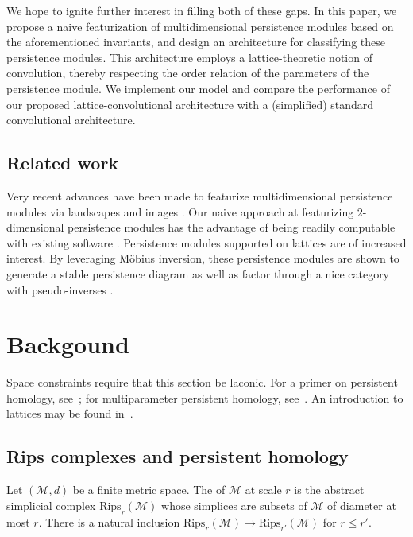 \documentclass{article}
\begin{document}
We hope to ignite further interest in filling both of these gaps. In this paper, we
propose a naive featurization of multidimensional persistence modules based on
the aforementioned invariants, and design an architecture for classifying these
persistence modules. This architecture employs a lattice-theoretic notion of
convolution, thereby respecting the order relation of the parameters of the
persistence module. We implement our model and compare the performance of our
proposed lattice-convolutional architecture with a (simplified) standard
convolutional architecture.

\subsection*{Related work}

Very recent advances have been made to featurize multidimensional persistence modules via
landscapes \cite{vipond2020multiparameter} and images \cite{carriere2020multiparameter}.
Our naive approach at featurizing $2$-dimensional persistence modules has the advantage
of being readily computable with existing software \cite{lesnick_interactive_2015}.
Persistence modules supported on lattices are of increased interest.
By leveraging M\"{o}bius inversion, these persistence modules are shown to generate a stable persistence diagram \cite{mccleary2020edit} as well as factor through a nice category with pseudo-inverses \cite{krishnan2020invertibility}.


\section{Backgound}

Space constraints require that this section be laconic. For a primer on
persistent homology, see~\cite{ghrist_barcodes:_2008, carlsson_topology_2009};
for multiparameter persistent homology, see~\cite{lesnick_interactive_2015}. An
introduction to lattices may be found in~\cite{davey2002introduction}.

\subsection{Rips complexes and persistent homology}
Let $(\mathcal M,d)$ be a finite metric space. The  of $\mathcal M$ at scale $r$ is the abstract simplicial complex
$\text{Rips}_r(\mathcal M)$ whose simplices are subsets of $\mathcal M$ of
diameter at most $r$. There is a natural inclusion $\text{Rips}_r(\mathcal M)
\to \text{Rips}_{r'}(\mathcal M)$ for $r \leq r'$.
\end{document}

